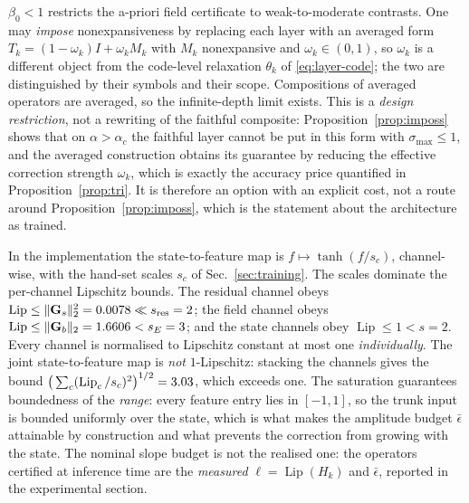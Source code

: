 \documentclass[journal,cmes,article,submit,moreauthors,pdftex]{Definitions/tsp}
\newcommand{\norm}[1]{\lVert #1 \rVert}
\newcommand{\numv}[1]{#1}
\begin{document}
\begin{Remark}\label{rem:averaged}
$\beta_0<1$ restricts the a-priori field certificate to weak-to-moderate contrasts. One may
\emph{impose} nonexpansiveness by replacing each layer with an averaged form
$T_k=(1-\omega_k)I+\omega_kM_k$ with $M_k$ nonexpansive and $\omega_k\in(0,1)$, so
$\omega_k$ is a different object from the code-level relaxation $\theta_k$ of \eqref{eq:layer-code};
the two are distinguished by their symbols and their scope. Compositions of averaged operators are
averaged, so the infinite-depth limit exists. This is a \emph{design restriction}, not a rewriting of
the faithful composite: Proposition~\ref{prop:imposs} shows that on $\alpha>\alpha_c$ the faithful
layer cannot be put in this form with $\sigma_{\max}\le1$, and the averaged construction obtains its
guarantee by reducing the effective correction strength $\omega_k$, which is exactly the accuracy
price quantified in Proposition~\ref{prop:tri}. It is therefore an option with an explicit cost, not a route
around Proposition~\ref{prop:imposs}, which is the statement about the architecture as trained.
\end{Remark}

\begin{Remark}\label{rem:featscale}
In the implementation the state-to-feature map is $f\mapsto\tanh(f/s_c)$, channel-wise, with the
hand-set scales $s_c$ of Sec.~\ref{sec:training}. The scales dominate the per-channel Lipschitz
bounds. The residual channel obeys
$\operatorname{Lip}\le\norm{\mathbf{G}_s}_2^{2}=\numv{\NumLipResidChan}\ll s_{\mathrm{res}}=2$;
the field channel obeys $\operatorname{Lip}\le\norm{\mathbf{G}_b}_2=\numv{\gbnorm}<s_E=3$; and the
state channels obey $\operatorname{Lip}\le1<s=2$. Every channel is
normalised to Lipschitz constant at most one \emph{individually}. The joint state-to-feature map is \emph{not} $1$-Lipschitz: stacking the channels gives the bound
$\big(\sum_c(\operatorname{Lip}_c/s_c)^{2}\big)^{1/2}=\numv{\NumFeatJointLip}$, which exceeds one.
The saturation guarantees boundedness of the \emph{range}: every feature entry lies in
$[-1,1]$, so the trunk input is bounded uniformly over the state, which is what makes the
amplitude budget $\bar\epsilon$ attainable by construction and what prevents the correction from
growing with the state. The nominal slope budget is not the realised one: the operators certified at inference time are
the \emph{measured} $\ell=\operatorname{Lip}(H_k)$ and
$\bar\epsilon$, reported in the experimental section.
\end{Remark}
\end{document}
